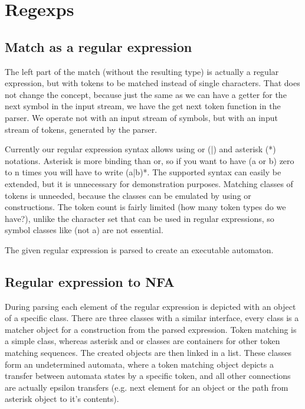 \section{Regexps}
\label{sec:regexps}

\subsection{Match as a regular expression}
The left part of the match (without the resulting type) is actually a regular expression, but with tokens to be matched instead of single characters. That does not change the concept, because just the same as we can have a getter for the next symbol in the input stream, we have the get next token function in the parser. We operate not with an input stream of symbols, but with an input stream of tokens, generated by the parser.

Currently our regular expression syntax allows using or (|) and asterisk (*) notations. Asterisk is more binding than or, so if you want to have (a or b) zero to n times you will have to write (a|b)*. The supported syntax can easily be extended, but it is unnecessary for demonstration purposes. Matching classes of tokens is unneeded, because the classes can be emulated by using or constructions. The token count is fairly limited (how many token types do we have?), unlike the character set that can be used in regular expressions, so symbol classes like (not a) are not essential. 

The given regular expression is parsed to create an executable automaton. 

\subsection{Regular expression to NFA}
During parsing each element of the regular expression is depicted with an object of a specific class. There are three classes with a similar interface, every class is a matcher object for a construction from the parsed expression. Token matching is a simple class, whereas asterisk and or classes are containers for other token matching sequences. The created objects are then linked in a list. These classes form an undetermined automata, where a token matching object depicts a transfer between automata states by a specific token, and all other connections are actually epsilon transfers (e.g. next element for an object or the path from asterisk object to it's contents).

